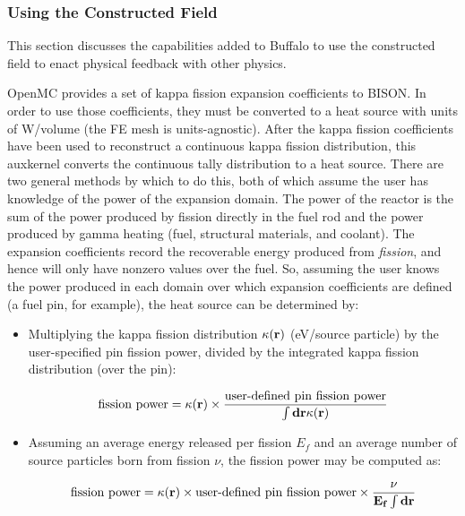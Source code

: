 \documentclass[10pt]{article}
\newcommand{\beq}{\begin{equation}}
\newcommand{\eeq}{\end{equation}}
\newcounter{subsubsubsection}[subsubsection]
\numberwithin{equation}{section} %
\begin{document}
\subsubsection{Using the Constructed Field}
This section discusses the capabilities added to Buffalo to use the constructed field to enact physical feedback with other physics.

OpenMC provides a set of kappa fission expansion coefficients to BISON. In order to use those coefficients, they must be converted to a heat source with units of W/volume (the FE mesh is units-agnostic). After the kappa fission coefficients have been used to reconstruct a continuous kappa fission distribution, this auxkernel converts the continuous tally distribution to a heat source. There are two general methods by which to do this, both of which assume the user has knowledge of the power of the expansion domain. The power of the reactor is the sum of the power produced by fission directly in the fuel rod and the power produced by gamma heating (fuel, structural materials, and coolant). The expansion coefficients record the recoverable energy produced from {\it fission}, and hence will only have nonzero values over the fuel. So, assuming the user knows the power produced in each domain over which expansion coefficients are defined (a fuel pin, for example), the heat source can be determined by: 

\begin{itemize}
\item Multiplying the kappa fission distribution \(\kappa(\bf{r})\) (eV/source particle) by the user-specified pin fission power, divided by the integrated kappa fission distribution (over the pin):

\beq
\textrm{fission power}=\kappa(\bf{r})\times\frac{\textrm{user-defined pin fission power}}{\int d\bf{r}\kappa({\bf r})}
\eeq

\item Assuming an average energy released per fission \(E_f\) and an average number of source particles born from fission \(\nu\), the fission power may be computed as:

\beq
\textrm{fission power}=\kappa(\bf{r})\times\textrm{user-defined pin fission power}\times\frac{\nu}{E_f\int d\textbf{r}}
\eeq
\end{itemize}
\end{document}
